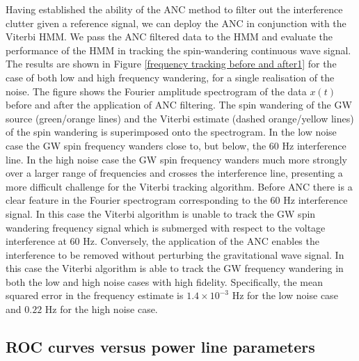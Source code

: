 \documentclass[pra,superscriptaddress,reprint,amsmath,amssymb,nofootinbib]{revtex4-2}
\begin{document}
Having established the ability of the ANC method to filter out the interference clutter given a reference signal, we can deploy the ANC in conjunction with the Viterbi HMM. We pass the ANC filtered data to the HMM and evaluate the performance of the HMM in tracking the spin-wandering continuous wave signal. The results are shown in  Figure \ref{frequency tracking before and after1} for the case of both low and high frequency wandering, for a single realisation of the noise. The figure shows the Fourier amplitude spectrogram of the data $x(t)$ before and after the application of ANC filtering. The spin wandering of the GW source (green/orange lines) and the Viterbi estimate (dashed orange/yellow lines) of the spin wandering is superimposed onto the spectrogram. In the low noise case the GW spin frequency wanders close to, but below, the 60 Hz interference line. In the high noise case the GW spin frequency wanders much more strongly over a larger range of frequencies and crosses the interference line, presenting a more difficult challenge for the Viterbi tracking algorithm. Before ANC there is a clear feature in the Fourier spectrogram corresponding to the 60 Hz interference signal. In this case the Viterbi algorithm is unable to track the GW spin wandering frequency signal which is submerged with respect to the voltage interference at 60 Hz. Conversely,  the application of the ANC enables the interference to be removed without perturbing the gravitational wave signal. In this case the Viterbi algorithm is able to track the GW frequency wandering in both the low and high noise cases with high fidelity. Specifically, the mean squared error in the frequency estimate is $1.4 \times 10^{-3}$ Hz for the low noise case and $0.22$ Hz for the high noise case. 




\subsection{ROC curves versus power line parameters} \label{sec:roc1}
\end{document}
